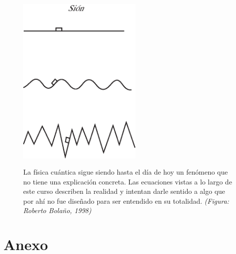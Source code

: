 \documentclass[10pt,twocolumn,titlepage]{article}
\begin{document}
\begin{figure}[!htb]
\centering
\includegraphics[width=6cm]{fig/sion.eps}
\label{fig:sion}
\caption{La física cuántica sigue siendo hasta el día de hoy un fenómeno que no tiene una explicación concreta. Las ecuaciones vistas a lo largo de este curso describen la realidad y intentan darle sentido a algo que por ahí no fue diseñado para ser entendido en su totalidad. \emph{(Figura: Roberto Bolaño, 1998)}}
\end{figure}
\clearpage
\part{Anexo}
\end{document}
